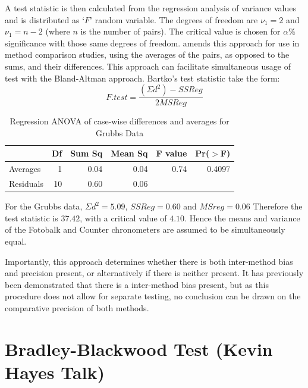 \documentclass[12pt, a4paper]{report}
\theoremstyle{plain}
\theoremstyle{definition}
\theoremstyle{remark}
\begin{document}
	A test statistic is then calculated from the regression analysis
	of variance values \citep{BB89} and is distributed as `$F$' random
	variable. The degrees of freedom are $\nu_{1}=2$ and $\nu_{1}=n-2$
	(where $n$ is the number of pairs). The critical value is chosen
	for $\alpha\%$ significance with those same degrees of freedom.
	\citet{Bartko} amends this approach for use in method
	comparison studies, using the averages of the pairs, as opposed to
	the sums, and their differences. This approach can facilitate
	simultaneous usage of test with the Bland-Altman approach.
	Bartko's test statistic take the form:
	\[ F.test = \frac{(\Sigma d^{2})-SSReg}{2MSReg}
	\]
	\begin{table}[h!]
		\begin{center}
			\begin{tabular}{lrrrrr}
				\hline
				& Df & Sum Sq & Mean Sq & F value & Pr($>$F) \\
				\hline
				Averages & 1 & 0.04 & 0.04 & 0.74 & 0.4097 \\
				Residuals & 10 & 0.60 & 0.06 &  &  \\
				\hline
			\end{tabular}
			\caption{Regression ANOVA of case-wise differences and averages
				for Grubbs Data}
		\end{center}
	\end{table}
	
	For the Grubbs data, $\Sigma d^{2}=5.09 $, $SSReg = 0.60$ and
	$MSreg=0.06$ Therefore the test statistic is $37.42$, with a
	critical value of $4.10$. Hence the means and variance of the
	Fotobalk and Counter chronometers are assumed to be simultaneously
	equal.
	
	Importantly, this approach determines whether there is both
	inter-method bias and precision present, or alternatively if there
	is neither present. It has previously been demonstrated that there
	is a inter-method bias present, but as this procedure does not
	allow for separate testing, no conclusion can be drawn on the
	comparative precision of both methods.
	


	\section{Bradley-Blackwood Test (Kevin Hayes Talk)}
	
\end{document}
